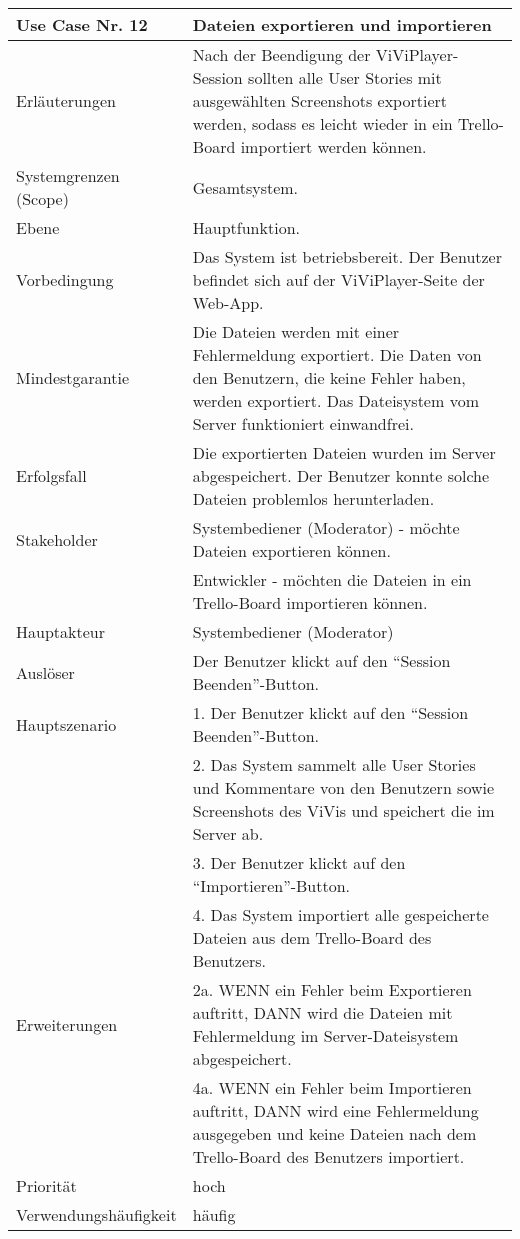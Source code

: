 \begin{tabularx}{\linewidth}{|l|X|}
	\hline
	Use Case Nr. 12			& \textbf{Dateien exportieren und importieren} \\ \hline
	Erläuterungen			& Nach der Beendigung der ViViPlayer-Session sollten alle User Stories mit 
							  ausgewählten Screenshots exportiert werden, sodass es leicht wieder in ein Trello-Board importiert werden können. \\ \hline
	Systemgrenzen (Scope)	& Gesamtsystem. \\ \hline
	Ebene					& Hauptfunktion. \\ \hline
	Vorbedingung			& Das System ist betriebsbereit. Der Benutzer befindet sich auf der 
							  ViViPlayer-Seite der Web-App. \\ \hline
	Mindestgarantie			& Die Dateien werden mit einer Fehlermeldung exportiert. Die 
							  Daten von den Benutzern, die keine Fehler haben, werden exportiert. Das Dateisystem vom Server funktioniert einwandfrei.\\ \hline
	Erfolgsfall				& Die exportierten Dateien wurden im Server abgespeichert. Der 
							  Benutzer konnte solche Dateien problemlos herunterladen. \\ \hline
	Stakeholder				& Systembediener (Moderator) - möchte Dateien exportieren können. \\ 
							& Entwickler - möchten die Dateien in ein Trello-Board importieren können. \\ \hline
	Hauptakteur				& Systembediener (Moderator) \\ \hline
	Auslöser				& Der Benutzer klickt auf den ``Session Beenden''-Button. \\ \hline	
	Hauptszenario			& 1. Der Benutzer klickt auf den ``Session Beenden''-Button. \\
							& 2. Das System sammelt alle User Stories und Kommentare von den 
							  Benutzern sowie Screenshots des ViVis und speichert die im Server ab. \\
							& 3. Der Benutzer klickt auf den ``Importieren''-Button. \\
							& 4. Das System importiert alle gespeicherte Dateien aus dem Trello-Board des
							  Benutzers. \\ \hline
	Erweiterungen			& 2a. WENN ein Fehler beim Exportieren auftritt, DANN wird die Dateien mit 
							  Fehlermeldung im Server-Dateisystem abgespeichert. \\ 
							& 4a. WENN ein Fehler beim Importieren auftritt, DANN wird eine Fehlermeldung 
							  ausgegeben und keine Dateien nach dem Trello-Board des Benutzers importiert. 
							  \\ \hline
	Priorität				& hoch \\ \hline
	Verwendungshäufigkeit	& häufig \\ \hline
\end{tabularx}

